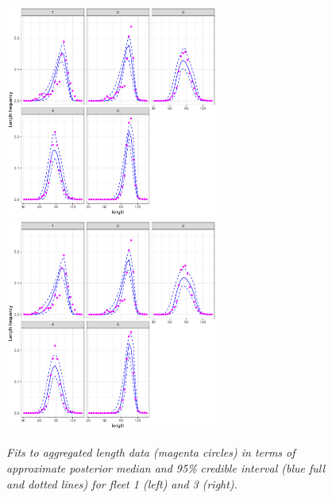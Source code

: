 \documentclass[11pt]{article}
\begin{document}
\begin{figure}[hb]
    \begin{center}
       \includegraphics[width=7cm,height=7cm]{figs/case4_lffits.pdf}\includegraphics[width=7cm,height=7cm]{figs/case4a_lffits.pdf} 
    \end{center}
    \caption{\textit{Fits to aggregated length data (magenta circles) in terms of approximate posterior
median and 95\% credible interval (blue full and dotted lines) for fleet 1 (left) and 3 (right).}}
\end{figure}
\end{document}
